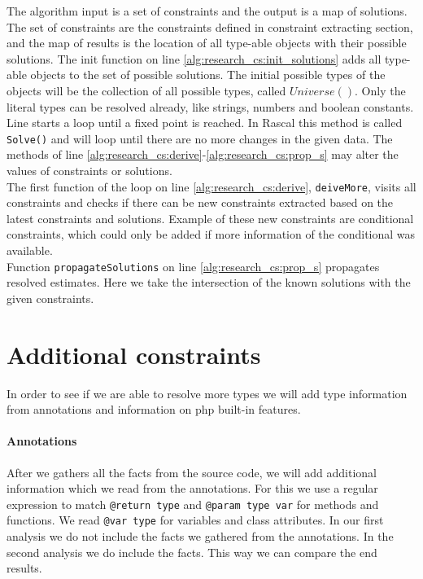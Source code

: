 \documentclass[../main.tex]{subfiles}
\begin{document}
    
    The algorithm input is a set of constraints and the output is a map of solutions.
    The set of constraints are the constraints defined in constraint extracting section, and the map of results is the location of all type-able objects with their possible solutions.
    The init function on line \ref{alg:research_cs:init_solutions} adds all type-able objects to the set of possible solutions.
    The initial possible types of the objects will be the collection of all possible types, called $Universe()$.
    Only the literal types can be resolved already, like strings, numbers and boolean constants.
    \\
    Line \label{alg:research_cs:loop_start} starts a loop until a fixed point is reached. 
    In Rascal this method is called \texttt{Solve()} and will loop until there are no more changes in the given data.
    The methods of line \ref{alg:research_cs:derive}-\ref{alg:research_cs:prop_s} may alter the values of constraints or solutions.
    \\
    The first function of the loop on line \ref{alg:research_cs:derive}, \texttt{deiveMore}, visits all constraints and checks if there can be new constraints extracted based on the latest constraints and solutions.
    Example of these new constraints are conditional constraints, which could only be added if more information of the conditional was available.
    \\
    Function \texttt{propagateSolutions} on line \ref{alg:research_cs:prop_s} propagates resolved estimates. 
    Here we take the intersection of the known solutions with the given constraints.
        
        
    \section{Additional constraints}\label{sec:design_additional_contraints}
    In order to see if we are able to resolve more types we will add type information from annotations and information on php built-in features.
    
    \paragraph{Annotations}  
    After we gathers all the facts from the source code, we will add additional information which we read from the annotations.
    For this we use a regular expression to match \texttt{@return type} and \texttt{@param type var} for methods and functions.
    We read \texttt{@var type} for variables and class attributes.
    In our first analysis we do not include the facts we gathered from the annotations. 
    In the second analysis we do include the facts.
    This way we can compare the end results.
    
\end{document}
